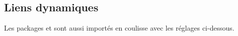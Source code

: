 

\usepackage{../macroenv/macroenv}
\usepackage{../listing/listing}
\usepackage{../inenglish/inenglish}


\usepackage[lang = french]{main}





\subsection{Liens dynamiques}

Les packages  et   sont aussi importés en coulisse avec les réglages ci-dessous.

\begin{bdoclatex}[code]
\hypersetup{
    colorlinks,
    citecolor = orange!75!black,
    filecolor = orange!75!black,
    linkcolor = orange!75!black,
    urlcolor  = orange!75!black
}
\end{bdoclatex}


